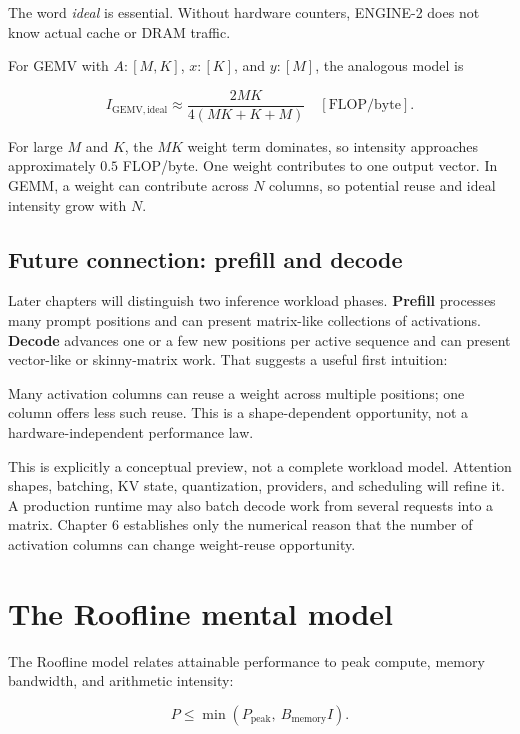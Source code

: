 The word \emph{ideal} is essential. Without hardware counters, ENGINE-2
does not know actual cache or DRAM traffic.

For GEMV with \(A:[M,K]\), \(x:[K]\), and \(y:[M]\), the analogous model
is

\begin{equation}
I_{\mathrm{GEMV,ideal}}
\approx\frac{2MK}{4(MK+K+M)}\quad[\mathrm{FLOP/byte}].
\end{equation}

For large \(M\) and \(K\), the \(MK\) weight term dominates, so
intensity approaches approximately \(0.5\) FLOP/byte. One weight
contributes to one output vector. In GEMM, a weight can contribute
across \(N\) columns, so potential reuse and ideal intensity grow with
\(N\).

\subsection{Future connection: prefill and
decode}\label{future-connection-prefill-and-decode}

Later chapters will distinguish two inference workload phases.
\textbf{Prefill} processes many prompt positions and can present
matrix-like collections of activations. \textbf{Decode} advances one or
a few new positions per active sequence and can present vector-like or
skinny-matrix work. That suggests a useful first intuition:

Many activation columns can reuse a weight across multiple positions; one column offers less such reuse. This is a shape-dependent opportunity, not a hardware-independent performance law.

This is explicitly a conceptual preview, not a complete workload model.
Attention shapes, batching, KV state, quantization, providers, and
scheduling will refine it. A production runtime may also batch decode
work from several requests into a matrix. Chapter 6 establishes only the
numerical reason that the number of activation columns can change
weight-reuse opportunity.

\section{The Roofline mental model}\label{the-roofline-mental-model}

The Roofline model relates attainable performance to peak compute,
memory bandwidth, and arithmetic intensity:

\begin{equation}
P\le\min\left(P_{\mathrm{peak}},\ B_{\mathrm{memory}}I\right).
\end{equation}

